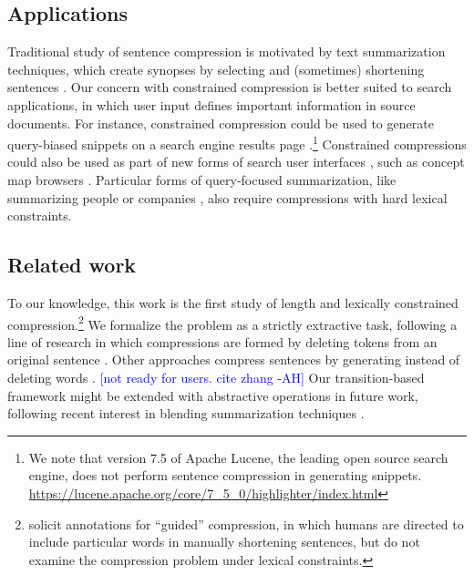 \documentclass[11pt,a4paper]{article}
\newcommand{\ahcomment}[1]{\textcolor{blue}{[#1 -AH]}}
\begin{document}
\subsection{Applications}

Traditional study of sentence compression is motivated by text summarization techniques, which create synopses by selecting and (sometimes) shortening sentences \cite{Knight2000StatisticsBasedS,vanderwende2007beyond,martins2009summarization}.  Our concern with constrained compression is better suited to search applications, in which user input defines important information in source documents. For instance, constrained compression could be used to generate query-biased snippets on a search engine results page \cite{tombros1998advantages,Metzler2008MachineLS,kanungo2009predicting}.\footnote{We note that version 7.5 of Apache Lucene, the leading open source search engine, does not perform sentence compression in generating snippets. \url{https://lucene.apache.org/core/7_5_0/highlighter/index.html}} Constrained compressions could also be used as part of new forms of search user interfaces \cite{hearst2009search}, such as concept map browsers \cite{falke2017graphdocexplore}. Particular forms of query-focused summarization, like summarizing people \cite{w04} or companies \cite{filippova2009company}, also require compressions with hard lexical constraints. 

\subsection{Related work}

To our knowledge, this work is the first study of length and lexically constrained compression.\footnote{\citet{Li2013DocumentSV} solicit annotations for ``guided'' compression, in which humans are directed to include particular words in manually shortening sentences, but do not examine the compression problem under lexical constraints.} We formalize the problem as a strictly extractive task, following a line of research in which compressions are formed by deleting tokens from an original sentence \cite{clarke2008global,filippova2008dependency,filippova2015sentence}. Other approaches compress sentences by generating instead of deleting words \cite{rush2015neural,mallinson18}. \ahcomment{not ready for users. cite zhang} Our transition-based framework might be extended with abstractive operations in future work, following recent interest in blending summarization techniques \cite{P17-1099}.
\end{document}
